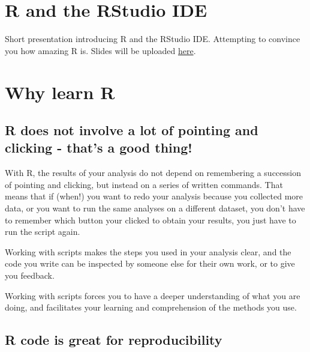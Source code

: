 \documentclass[
]{book}
\begin{document}
\hypertarget{r-and-the-rstudio-ide}{%
\section{R and the RStudio IDE}\label{r-and-the-rstudio-ide}}

Short presentation introducing R and the RStudio IDE. Attempting to convince you how amazing R is. Slides will be uploaded \href{intro.pdf}{here}.

\hypertarget{why-learn-r}{%
\section{Why learn R}\label{why-learn-r}}

\hypertarget{r-does-not-involve-a-lot-of-pointing-and-clicking---thats-a-good-thing}{%
\subsection*{R does not involve a lot of pointing and clicking - that's a good thing!}\label{r-does-not-involve-a-lot-of-pointing-and-clicking---thats-a-good-thing}}

With R, the results of your analysis do not depend on remembering a succession of pointing and clicking, but instead on a series of written commands. That means that if (when!) you want to redo your analysis because you collected more data, or you want to run the same analyses on a different dataset, you don't have to remember which button your clicked to obtain your results, you just have to run the script again.

Working with scripts makes the steps you used in your analysis clear, and the code you write can be inspected by someone else for their own work, or to give you feedback.

Working with scripts forces you to have a deeper understanding of what you are doing, and facilitates your learning and comprehension of the methods you use.

\hypertarget{r-code-is-great-for-reproducibility}{%
\subsection*{R code is great for reproducibility}\label{r-code-is-great-for-reproducibility}}
\end{document}

